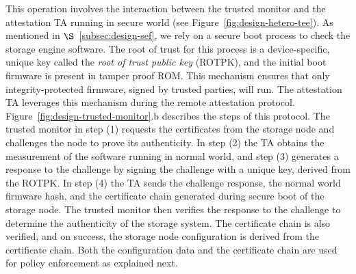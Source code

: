 This operation involves the interaction between the trusted monitor and the attestation TA running in secure world (see Figure~\ref{fig:design-hetero-tee}). As mentioned in $\S$~\ref{subsec:design-sef}, we rely on a secure boot process to check the storage engine software.
The root of trust for this process is a device-specific, unique key called the \textit{root of trust public key} (ROTPK), and the initial boot firmware is present in tamper proof ROM. This mechanism ensures that only integrity-protected firmware, signed by trusted parties, will run. The attestation TA leverages this mechanism during the remote attestation protocol. Figure~\ref{fig:design-trusted-monitor}.b describes the steps of this protocol.
The trusted monitor in step (1) requests the certificates from the storage node and challenges the node to prove its authenticity. In step (2) the TA obtains the measurement of the software running in normal world, and step (3) generates a response to the challenge by signing the challenge with a unique key, derived from the ROTPK. %
In step (4) the TA sends the challenge response, the normal world firmware hash, and the certificate chain generated during secure boot of the storage node. The trusted monitor then verifies the response to the challenge to determine the authenticity of the storage system. The certificate chain is also verified, and on success, the storage node configuration is derived from the certificate chain. Both the configuration data and the certificate chain are used for policy enforcement as explained next. 


